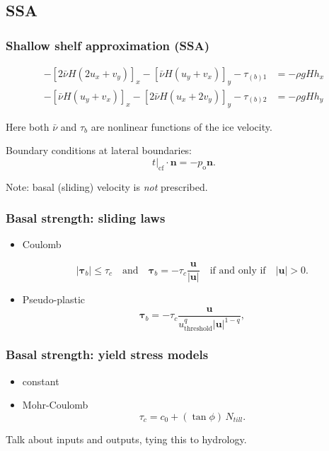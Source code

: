 \documentclass[hide notes,intlimits]{beamer}
\begin{document}
\subsection{SSA}
\label{sec:ssa}

\begin{frame}
  \frametitle{Shallow shelf approximation (SSA)}

  \begin{align}
    -\left[ 2\bar\nu H\left( 2u_{x} + v_{y}\right)\right]_{x} - \left[\bar\nu
    H\left(u_{y}+v_{x} \right) \right]_{y} - \tau_{(b)1} &= - \rho gH h_{x} \\
    -\left[ \bar\nu H\left( u_{y} + v_{x} \right)\right]_{x} - \left[2\bar\nu
    H\left(u_{x}+2v_{y}  \right) \right]_{y} - \tau_{(b)2} &= -\rho gH h_{y}
  \end{align}

  Here both $\bar \nu$ and $\tau_{b}$ are nonlinear functions of the ice velocity.

  Boundary conditions at lateral boundaries:
  \begin{equation}
    \label{eq:5}
    \left.t\right|_{\text{cf}} \cdot \mathbf{n} = -p_{\text{o}} \mathbf{n}.
  \end{equation}

  Note: basal (sliding) velocity is \emph{not} prescribed.

\end{frame}

\begin{frame}
  \frametitle{Basal strength: sliding laws}

  \begin{itemize}
  \item Coulomb

    \begin{equation}
      \label{eq:11}
      |\boldsymbol{\tau}_b| \le \tau_c \quad \text{and} \quad \boldsymbol{\tau}_b =
      - \tau_c \frac{\mathbf{u}}{|\mathbf{u}|} \quad\text{if and only if}\quad |\mathbf{u}| > 0.
    \end{equation}
  \item Pseudo-plastic
  \begin{equation}
    \label{eq:10}
    \boldsymbol{\tau}_b =  - \tau_c \frac{\mathbf{u}}{u_{\text{threshold}}^q |\mathbf{u}|^{1-q}},
  \end{equation}
  \end{itemize}
\end{frame}

\begin{frame}
  \frametitle{Basal strength: yield stress models}

  \begin{itemize}
  \item constant
  \item Mohr-Coulomb
    \begin{equation}
      \label{eq:12}
      \tau_c = c_{0} + (\tan\phi)\,N_{till}.
    \end{equation}
  \end{itemize}

  Talk about inputs and outputs, tying this to hydrology.
\end{frame}
\end{document}
